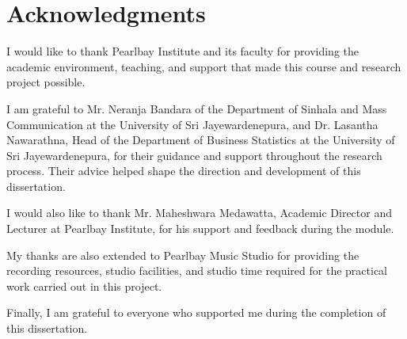 \chapter*{Acknowledgments}

I would like to thank Pearlbay Institute and its faculty for providing the academic environment, teaching, and support that made this course and research project possible.

I am grateful to Mr. Neranja Bandara of the Department of Sinhala and Mass Communication at the University of Sri Jayewardenepura, and Dr. Lasantha Nawarathna, Head of the Department of Business Statistics at the University of Sri Jayewardenepura, for their guidance and support throughout the research process. Their advice helped shape the direction and development of this dissertation.

I would also like to thank Mr. Maheshwara Medawatta, Academic Director and Lecturer at Pearlbay Institute, for his support and feedback during the module.

My thanks are also extended to Pearlbay Music Studio for providing the recording resources, studio facilities, and studio time required for the practical work carried out in this project.

Finally, I am grateful to everyone who supported me during the completion of this dissertation.
